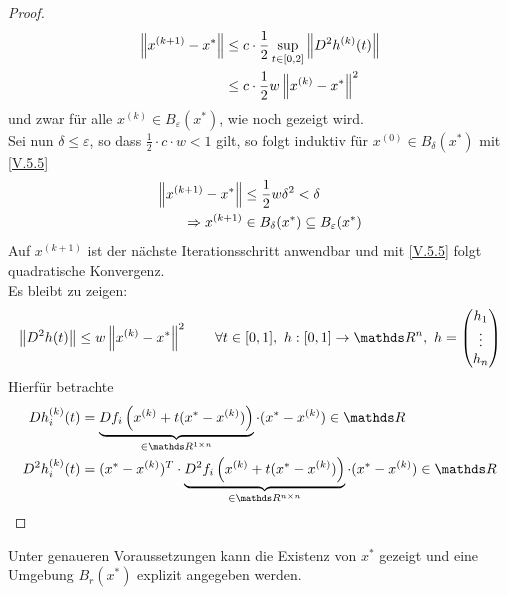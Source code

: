 \begin{proof}
	\begin{align}\nonumber
	\left\| x^{(k+1)}-x^{*} \right\| &\leq c\cdot \frac{1}{2} \sup_{t\in[0,2]} \left\| D^2h^{(k)}(t) \right\| \\
	& \leq c\cdot \frac{1}{2} w\left\| x^{(k)}-x^{*} \right\|^2
	\label{V.5.5}
	\end{align}
	und zwar für alle $x^{(k)}\in B_\varepsilon(x^{*})$, wie noch gezeigt wird.\\
	Sei nun $\delta \leq \varepsilon$, so dass $\frac{1}{2} \cdot c\cdot w <1$ gilt,
	so folgt induktiv für $x^{(0)}\in B_\delta(x^{*})$ mit \eqref{V.5.5}
	\begin{align*}
	\left\| x^{(k+1)}-x^{*} \right\| &\leq \frac{1}{2}w\delta^2 < \delta\\
	\Rightarrow x^{(k+1)}&\in B_\delta(x^{*})\subseteq B_\varepsilon(x^{*})
	\end{align*}
	Auf $x^{(k+1)} $ ist der nächste Iterationsschritt anwendbar
	und mit \eqref{V.5.5} folgt quadratische Konvergenz.\\
	Es bleibt zu zeigen:
	\begin{gather*}
	\nn{D^2h(t)} \leq w\nn{x^{(k)}-x^{*}}^2 \qquad \forall t\in [0,1],~
	h:[0,1]\rightarrow\Ren,~ h=\begin{pmatrix} h_1 \\ \vdots \\ h_n \end{pmatrix}
	\end{gather*}
	Hierfür betrachte
	\begin{align*}
	Dh_i^{(k)}(t)&=\underbrace{Df_i\left( x^{(k)}+t(x^{*}-x^{(k)})\right)}_{\in \R^{1\times n}}
	\cdot (x^{*}-x^{(k)})\in\R\\
	D^2h_i^{(k)}(t)&=(x^{*}-x^{(k)})^T\cdot
	\underbrace{D^2f_i\left( x^{(k)}+t(x^{*}-x^{(k)})\right)}_{\in \R^{n\times n}}
	\cdot (x^{*}-x^{(k)})\in\R\\
	\end{align*}
\end{proof}

Unter genaueren Voraussetzungen kann die Existenz von $x^{*}$ gezeigt 
und eine Umgebung $B_r(x^{*})$ explizit angegeben werden.

